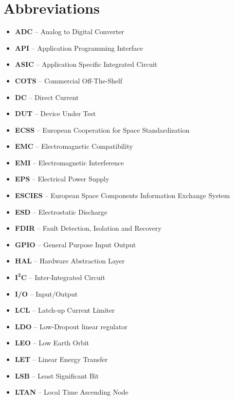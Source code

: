 \section{Abbreviations}
\begin{itemize}
    \item    \textbf{ADC}      --    Analog to Digital Converter
    \item    \textbf{API}      --    Application Programming Interface
    \item    \textbf{ASIC}     --    Application Specific Integrated Circuit
    \item    \textbf{COTS}     --    Commercial Off-The-Shelf
    \item    \textbf{DC}       --    Direct Current
    \item    \textbf{DUT}      --    Device Under Test
    \item    \textbf{ECSS}     --    European Cooperation for Space Standardization
    \item    \textbf{EMC}      --    Electromagnetic Compatibility
    \item    \textbf{EMI}      --    Electromagnetic Interference
    \item    \textbf{EPS}      --    Electrical Power Supply
    \item    \textbf{ESCIES}   --    European Space Components Information Exchange System
    \item    \textbf{ESD}      --    Electrostatic Discharge
    \item    \textbf{FDIR}     --    Fault Detection, Isolation and Recovery
    \item    \textbf{GPIO}     --    General Purpose Input Output
    \item    \textbf{HAL}      --    Hardware Abstraction Layer
    \item    \textbf{$\mathbf{I^2C}$}   --    Inter-Integrated Circuit
    \item    \textbf{I/O}      --    Input/Output
    \item    \textbf{LCL}      --    Latch-up Current Limiter
    \item    \textbf{LDO}      --    Low-Dropout linear regulator
    \item    \textbf{LEO}      --    Low Earth Orbit
    \item    \textbf{LET}      --    Linear Energy Transfer
    \item    \textbf{LSB}      --    Least Significant Bit
    \item    \textbf{LTAN}     --    Local Time Ascending Node

\end{itemize}
